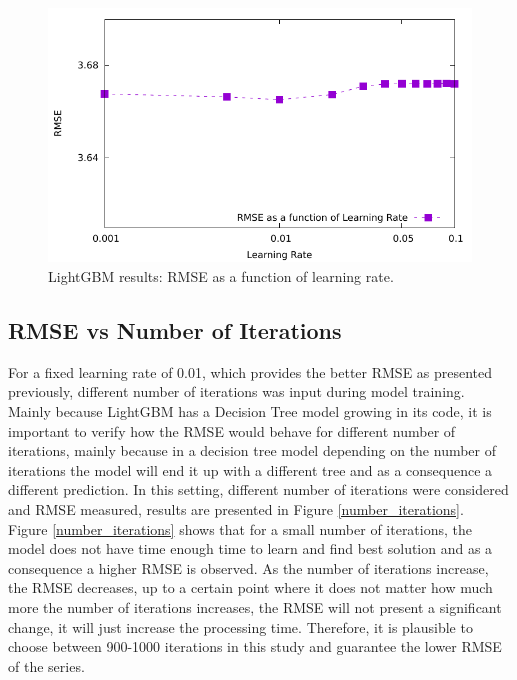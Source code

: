 \documentclass[letterpaper, 10 pt, conference]{ieeeconf}  %
\begin{document}
\begin{figure}[thpb]
\centering
\includegraphics[scale=0.7]{Figures/learningrate_rmse_lgbm.pdf}
\caption{LightGBM results: RMSE as a function of learning rate.}
\label{learning_rate}
\end{figure}


\subsection{RMSE vs Number of Iterations}
For a fixed learning rate of 0.01, which provides the better RMSE as presented previously, different number of iterations was input during model training. Mainly because LightGBM has a Decision Tree model growing in its code, it is important to verify how the RMSE would behave for different number of iterations, mainly because in a decision tree model depending on the number of iterations the model will end it up with a different tree and as a consequence a different prediction. In this setting, different number of iterations were considered and RMSE measured, results are presented in Figure \ref{number_iterations}. \\

Figure \ref{number_iterations} shows that for a small number of iterations, the model does not have time enough time to learn and find best solution and as a consequence a higher RMSE is observed. As the number of iterations increase, the RMSE decreases, up to a certain point where it does not matter how much more the number of iterations increases, the RMSE will not present a significant change, it will just increase the processing time. Therefore, it is plausible to choose between 900-1000 iterations in this study and guarantee the lower RMSE of the series.
\end{document}
